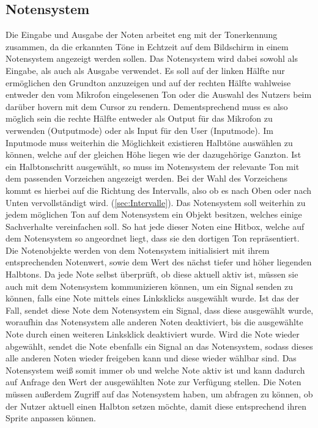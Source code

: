 \subsection{Notensystem}
Die Eingabe und Ausgabe der Noten arbeitet eng mit der Tonerkennung zusammen, da die erkannten Töne in Echtzeit auf dem Bildschirm in einem Notensystem angezeigt werden sollen. Das Notensystem wird dabei sowohl als Eingabe, als auch als Ausgabe verwendet. Es soll auf der linken Hälfte nur ermöglichen den Grundton anzuzeigen und auf der rechten Hälfte wahlweise entweder den vom Mikrofon eingelesenen Ton oder die Auswahl des Nutzers beim darüber hovern mit dem Cursor zu rendern. Dementsprechend muss es also möglich sein die rechte Hälfte entweder als Output für das Mikrofon zu verwenden (Outputmode) oder als Input für den User (Inputmode).
Im Inputmode muss weiterhin die Möglichkeit existieren Halbtöne auswählen zu können, welche auf der gleichen Höhe liegen wie der dazugehörige Ganzton. Ist ein Halbtonschritt ausgewählt, so muss im Notensystem der relevante Ton mit dem passenden Vorzeichen angezeigt werden. Bei der Wahl des Vorzeichens kommt es hierbei auf die Richtung des Intervalls, also ob es nach Oben oder nach Unten vervollständigt wird. (\ref{sec:Intervalle}). 
Das Notensystem soll weiterhin zu jedem möglichen Ton auf dem Notensystem ein Objekt besitzen, welches einige Sachverhalte vereinfachen soll. So hat jede dieser Noten eine Hitbox, welche auf dem Notensystem so angeordnet liegt, dass sie den dortigen Ton repräsentiert. Die Notenobjekte werden von dem Notensystem initialisiert mit ihrem entsprechenden Notenwert, sowie dem Wert des nächst tiefer und höher liegenden Halbtons. Da jede Note selbst überprüft, ob diese aktuell aktiv ist, müssen sie auch mit dem Notensystem kommunizieren können, um ein Signal senden zu können, falls eine Note mittels eines Linksklicks ausgewählt wurde. Ist das der Fall, sendet diese Note dem Notensystem ein Signal, dass diese ausgewählt wurde, woraufhin das Notensystem alle anderen Noten deaktiviert, bis die ausgewählte Note durch einen weiteren Linksklick deaktiviert wurde. Wird die Note wieder abgewählt, sendet die Note ebenfalls ein Signal an das Notensystem, sodass dieses alle anderen Noten wieder freigeben kann und diese wieder wählbar sind. Das Notensystem weiß somit immer ob und welche Note aktiv ist und kann dadurch auf Anfrage den Wert der ausgewählten Note zur Verfügung stellen. Die Noten müssen außerdem Zugriff auf das Notensystem haben, um abfragen zu können, ob der Nutzer aktuell einen Halbton setzen möchte, damit diese entsprechend ihren Sprite anpassen können. 
